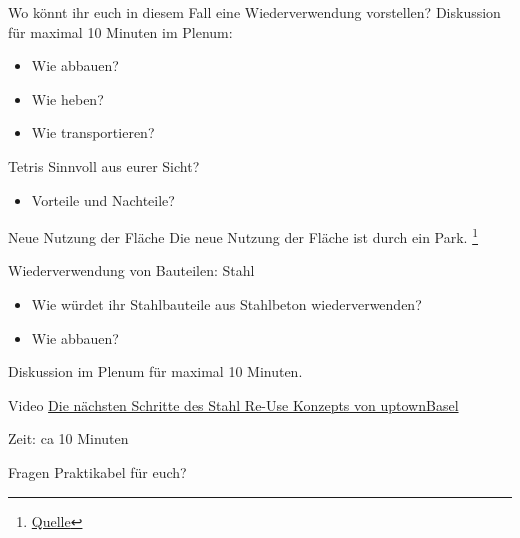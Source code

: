 \begin{frame}{Wo könnt ihr euch in diesem Fall \newline eine Wiederverwendung vorstellen?}
    Diskussion für maximal 10 Minuten im Plenum:
    \begin{itemize}
        \item [\textbullet] Wie abbauen? 
        \item [\textbullet] Wie heben? 
        \item [\textbullet] Wie transportieren?
    \end{itemize}
\end{frame}

\begin{frame}{Tetris}
    Sinnvoll aus eurer Sicht? 

    \begin{itemize}
        \item [\textbullet] Vorteile und Nachteile?
    \end{itemize}

\end{frame}

\begin{frame}{Neue Nutzung der Fläche}
    Die neue Nutzung der Fläche ist durch ein Park. \footnote{\href{https://www.bzbasel.ch/basel/basel-stadt/volta-nord-gruene-oase-mit-83-baeumen-und-einem-zweistoeckigen-pavillon-das-sind-die-plaene-fuer-den-lysbuechelplatz-ld.2576182}{Quelle}}

\end{frame}

\begin{frame}{Wiederverwendung von Bauteilen: Stahl}
    \begin{itemize}
        \item Wie würdet ihr Stahlbauteile aus Stahlbeton wiederverwenden?
        \item Wie abbauen?
    \end{itemize}
    Diskussion im Plenum für maximal 10 Minuten.
\end{frame}


\begin{frame}{Video}
    \href{https://www.youtube.com/watch?v=D3MBcTZ1tI8}{Die nächsten Schritte des Stahl Re-Use Konzepts von uptownBasel
    }

    Zeit: ca 10 Minuten
\end{frame}

\begin{frame}{Fragen}
    Praktikabel für euch?


\end{frame}
    

